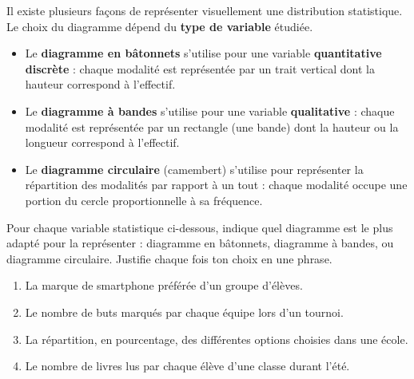 \documentclass[../../syllabus_1.tex]{subfiles}
\begin{document}
Il existe plusieurs façons de représenter visuellement une distribution statistique. Le choix du diagramme dépend du \textbf{type de variable} étudiée.
\begin{itemize}
    \item Le \textbf{diagramme en bâtonnets} s'utilise pour une variable \textbf{quantitative discrète} : chaque modalité est représentée par un trait vertical dont la hauteur correspond à l'effectif.
    \item Le \textbf{diagramme à bandes} s'utilise pour une variable \textbf{qualitative} : chaque modalité est représentée par un rectangle (une bande) dont la hauteur ou la longueur correspond à l'effectif.
    \item Le \textbf{diagramme circulaire} (camembert) s'utilise pour représenter la répartition des modalités par rapport à un tout : chaque modalité occupe une portion du cercle proportionnelle à sa fréquence.
\end{itemize}
\vspace{0.8cm}

\newpage
\begin{exercise}
    Pour chaque variable statistique ci-dessous, indique quel diagramme est le plus adapté pour la représenter : diagramme en bâtonnets, diagramme à bandes, ou diagramme circulaire. Justifie chaque fois ton choix en une phrase.
    \begin{enumerate}[itemsep=1.2cm]
        \item La marque de smartphone préférée d'un groupe d'élèves.
        \item Le nombre de buts marqués par chaque équipe lors d'un tournoi.
        \item La répartition, en pourcentage, des différentes options choisies dans une école.
        \item Le nombre de livres lus par chaque élève d'une classe durant l'été.
    \end{enumerate}
\end{exercise}
\vspace{0.8cm}
\end{document}
